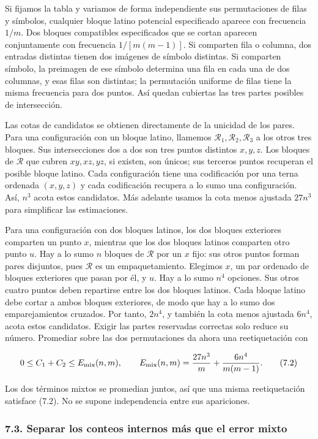 \documentclass[spanish,11pt,a4paper]{article}
\begin{document}
Si fijamos la tabla y variamos de forma independiente sus permutaciones de filas y símbolos, cualquier bloque latino potencial especificado aparece con frecuencia \(1/m\). Dos bloques compatibles especificados que se cortan aparecen conjuntamente con frecuencia \(1/[m(m-1)]\). Si comparten fila o columna, dos entradas distintas tienen dos imágenes de símbolo distintas. Si comparten símbolo, la preimagen de ese símbolo determina una fila en cada una de dos columnas, y esas filas son distintas; la permutación uniforme de filas tiene la misma frecuencia para dos puntos. Así quedan cubiertas las tres partes posibles de intersección.

Las cotas de candidatos se obtienen directamente de la unicidad de los pares. Para una configuración con un bloque latino, llamemos \(\mathcal R_1,\mathcal R_2,\mathcal R_3\) a los otros tres bloques. Sus intersecciones dos a dos son tres puntos distintos \(x,y,z\). Los bloques de \(\mathcal R\) que cubren \(xy,xz,yz\), si existen, son únicos; sus terceros puntos recuperan el posible bloque latino. Cada configuración tiene una codificación por una terna ordenada \((x,y,z)\) y cada codificación recupera a lo sumo una configuración. Así, \(n^3\) acota estos candidatos. Más adelante usamos la cota menos ajustada \(27n^3\) para simplificar las estimaciones.

Para una configuración con dos bloques latinos, los dos bloques exteriores comparten un punto \(x\), mientras que los dos bloques latinos comparten otro punto \(u\). Hay a lo sumo \(n\) bloques de \(\mathcal R\) por un \(x\) fijo: sus otros puntos forman pares disjuntos, pues \(\mathcal R\) es un empaquetamiento. Elegimos \(x\), un par ordenado de bloques exteriores que pasan por él, y \(u\). Hay a lo sumo \(n^4\) opciones. Sus otros cuatro puntos deben repartirse entre los dos bloques latinos. Cada bloque latino debe cortar a ambos bloques exteriores, de modo que hay a lo sumo dos emparejamientos cruzados. Por tanto, \(2n^4\), y también la cota menos ajustada \(6n^4\), acota estos candidatos. Exigir las partes reservadas correctas solo reduce su número. Promediar sobre las dos permutaciones da ahora una reetiquetación con

\[0\le C_1+C_2\le E_{\rm mix}(n,m),\qquad
E_{\rm mix}(n,m)=\frac{27n^3}{m}+\frac{6n^4}{m(m-1)}.\tag{7.2}\]

Los dos términos mixtos se promedian juntos, así que una misma reetiquetación satisface (7.2). No se supone independencia entre sus apariciones.

\subsubsection{7.3. Separar los conteos internos más que el error mixto}\label{separar-los-conteos-internos-muxe1s-que-el-error-mixto}
\end{document}
